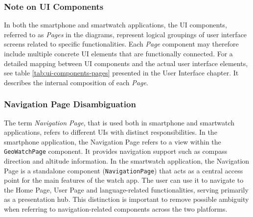  \subsubsection{Note on UI Components}
In both the smartphone and smartwatch applications, the UI components, referred to as \textit{Pages} in the diagrams, represent logical groupings of user interface screens related to specific functionalities. Each \textit{Page} component may therefore include multiple concrete UI elements that are functionally connected.
For a detailed mapping between UI components and the actual user interface elements, see table \ref{tab:ui-components-pages} presented in the User Interface chapter. It describes the internal composition of each \textit{Page}.

\subsubsection{Navigation Page Disambiguation}
The term \textit{Navigation Page}, that is used both in smartphone and smartwatch applications, refers to different UIs with distinct responsibilities.
In the smartphone application, the Navigation Page refers to a view within the \texttt{GeoWatchPage} component. It provides navigation support such as compass direction and altitude information.
In the smartwatch application, the Navigation Page is a standalone component (\texttt{NavigationPage}) that acts as a central access point for the main features of the watch app. The user can use it to navigate to the Home Page, User Page and language-related functionalities, serving primarily as a presentation hub.
This distinction is important to remove possible ambiguity when referring to navigation-related components across the two platforms.
\newpage



 




